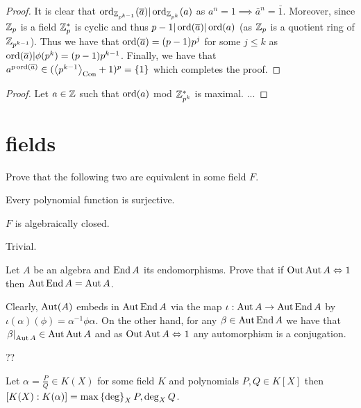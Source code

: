 \documentclass[8pt,a4paper]{article}
\begin{document}
\begin{proof}
    It is clear that $\mathop\mathrm{ord}_{\mathbb{Z}_{p^{k-1}}}(\overline{a})|\mathop\mathrm{ord}_{\mathbb{Z}_{p^k}}(a)$ as $a^n=1\implies \bar{a}^n=\bar{1}$. Moreover, since $\mathbb{Z}_p$ is a field $\mathbb{Z}^*_p$ is cyclic and thus $p-1|\mathop\mathrm{ord}(\overline{a})|\mathop\mathrm{ord}(a)$ (as $\mathbb{Z}_p$ is a quotient ring of $\mathbb{Z}_{p^{k-1}}$). Thus we have that $\mathop\mathrm{ord}(\overline{a})=(p-1)p^j$ for some $j\leq k$ as $\mathop\mathrm{ord}(\overline{a})|\phi(p^k)=(p-1)p^{k-1}$. Finally, we have that $a^{p\ord(\bar{a})}\in (\gen{p^{k-1}}_{\Con}+1)^p=\set{1}$ which completes the proof.
\end{proof}

\begin{proof}
    Let $a\in \mathbb{Z}$ such that $\mathop\mathrm{ord}(a)$ mod $\mathbb{Z}^*_{p^k}$ is maximal. ...
\end{proof}

\section{fields}

\begin{exercise}
    Prove that the following two are equivalent in some field $F$.
    \begin{statements}
        \item Every polynomial function is surjective.
        \item $F$ is algebraically closed.
    \end{statements}
\end{exercise}

\begin{solution}
    Trivial.
\end{solution}

\begin{exercise} Let $A$ be an algebra and $\mathop\mathrm{End}\nolimits{A}$ its endomorphisms. Prove that if $\Out{\Aut{A}}\iso 1$ then $\mathop\mathrm{Aut}\nolimits{\mathop\mathrm{End}\nolimits{A}}=\mathop\mathrm{Aut}\nolimits{A}$.
\end{exercise}
\def\iso{\equiv}
\begin{solution}
    Clearly, $\mathop\mathrm{Aut}\nolimits(A)$ embeds in $\mathop\mathrm{Aut}\nolimits{\mathop\mathrm{End}\nolimits{A}}$ via the map $\iota:\mathop\mathrm{Aut}\nolimits{A}\rightarrow\mathop\mathrm{Aut}\nolimits{\mathop\mathrm{End}\nolimits{A}}$ by $\iota(\alpha)(\phi)=\alpha^{-1}\phi\alpha$. On the other hand, for any $\beta\in\mathop\mathrm{Aut}\nolimits{\mathop\mathrm{End}\nolimits{A}}$ we have that $\left. \beta\right\vert_{\mathop\mathrm{Aut}\nolimits{A}}\in\mathop\mathrm{Aut}\nolimits{\mathop\mathrm{Aut}\nolimits{A}}$ and as $\Out{\Aut{A}}\iso 1$ any automorphism is a conjugation.

??
\end{solution}

\begin{lemma} Let $\alpha=\frac{P}{Q}\in K(X)$ for some field $K$ and polynomials $P,Q\in K[X]$ then $[K(X):K(\alpha)]=\max\set{\deg_X{P},\deg_X{Q}}$.
\end{lemma}
\end{document}
